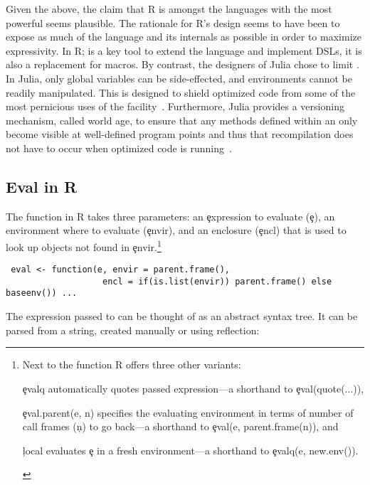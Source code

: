 \documentclass[review,screen,acmsmall]{acmart}
\begin{document}
Given the above, the claim that R is amongst the languages with the most
powerful \eval seems plausible. The rationale for R's design seems to have been
to expose as much of the language and its internals as possible in order to
maximize expressivity. In R; \eval is a key tool to extend the language and
implement DSLs, it is also a replacement for macros. By contrast, the designers
of Julia chose to limit \eval. In Julia, only global variables can be
side-effected, and environments cannot be readily manipulated. This is designed
to shield optimized code from some of the most pernicious uses of the
facility~\cite{oopsla18a}. Furthermore, Julia provides a versioning
mechanism, called world age, to ensure that any methods defined within an \eval
only become visible at well-defined program points and thus that recompilation
does not have to occur when optimized code is running~\cite{oopsla20a}.

\subsection{Eval in R}\label{sec:eval-in-r}

The \eval function in R takes three parameters: an \c{expression} to evaluate
(\c{e}), an environment where to evaluate (\c{envir}), and an enclosure
(\c{encl}) that is used to look up objects not found in \c{envir}.\footnote{Next to the \eval function R
  offers three other variants:
  \begin{inparaenum}[1.]
    \item \c{evalq} automatically quotes passed expression---a shorthand to
      \c{eval(quote(...))},
    \item \c{eval.parent(e, n)} specifies the evaluating
      environment in terms of number of call frames (\c{n}) to go back---a shorthand
      to \c{eval(e, parent.frame(n))}, and
    \item \c{local} evaluates \c{e} in a fresh
      environment---a shorthand to \c{evalq(e, new.env())}.
  \end{inparaenum} }
%
\begin{lstlisting}
 eval <- function(e, envir = parent.frame(),
                   encl = if(is.list(envir)) parent.frame() else baseenv()) ...
\end{lstlisting}

\noindent The expression passed to \eval can be thought of as an abstract
syntax tree. It can be parsed from a string, created manually or using
reflection:
\end{document}
